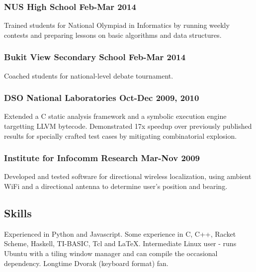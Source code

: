 \documentclass[letterpaper]{article}
\begin{document}
\subsubsection*{NUS High School \hfill Feb-Mar 2014}
Trained students for National Olympiad in Informatics by running weekly contests and preparing lessons on basic algorithms and data structures.

\subsubsection*{Bukit View Secondary School \hfill Feb-Mar 2014}
Coached students for national-level debate tournament.

\subsubsection*{DSO National Laboratories \hfill Oct-Dec 2009, 2010}
Extended a C static analysis framework and a symbolic execution engine targetting LLVM bytecode. Demonstrated 17x speedup over previously published results for specially crafted test cases by mitigating combinatorial explosion.

\subsubsection*{Institute for Infocomm Research \hfill Mar-Nov 2009}
Developed and tested software for directional wireless localization, using ambient WiFi and a directional antenna to determine user's position and bearing.

\vspace{1em}

\begin{center}
\section*{Skills}
\end{center}
Experienced in Python and Javascript. Some experience in C, C++, Racket Scheme, Haskell, TI-BASIC, Tcl and LaTeX. Intermediate Linux user - runs Ubuntu with a tiling window manager and can compile the occasional dependency. Longtime Dvorak (keyboard format) fan.
\end{document}
